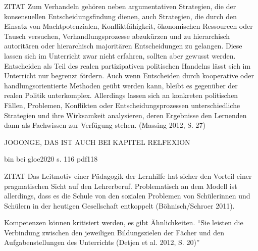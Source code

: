 ZITAT
 Zum Verhandeln gehören neben argumentativen Strategien, die der konsensuellen Entscheidungsfindung dienen, auch Strategien, die durch den Einsatz von Machtpotenzialen, Konfliktfähigkeit, ökonomischen Ressourcen oder Tausch versuchen, Verhandlungsprozesse abzukürzen und zu hierarchisch autoritären oder hierarchisch majoritären Entscheidungen zu gelangen. Diese lassen sich im Unterricht zwar nicht erfahren, sollten aber gewusst werden. Entscheiden als Teil des realen partizipativen politischen Handelns lässt sich im Unterricht nur begrenzt fördern. Auch wenn Entscheiden durch kooperative oder handlungsorientierte Methoden geübt werden kann, bleibt es gegenüber der realen Politik unterkomplex. Allerdings lassen sich an konkreten politischen Fällen, Problemen, Konflikten oder Entscheidungsprozessen unterschiedliche Strategien und ihre Wirksamkeit analysieren, deren Ergebnisse den Lernenden dann als Fachwissen zur Verfügung stehen. (Massing 2012, S. 27)

JOOONGE, DAS IST AUCH BEI KAPITEL RELFEXION

bin bei gloe2020 s. 116 pdf118


ZITAT
 Das Leitmotiv einer Pädagogik der Lernhilfe hat sicher den Vorteil einer pragmatischen Sicht auf den Lehrerberuf. Problematisch an dem Modell ist allerdings, dass es die Schule von den sozialen Problemen von Schülerinnen und Schülern in der heutigen Gesellschaft entkoppelt (Böhnisch/Schroer 2011). \autocite[51]{Sander.2016}

Kompetenzen können kritisiert werden, es gibt Ähnlichkeiten. \enquote{Sie leisten die Verbindung zwischen den jeweiligen Bildungszielen der Fächer und den Aufgabenstellungen des Unterrichts (Detjen et al. 2012, S. 20)} \autocite[18]{Massing.2022}

